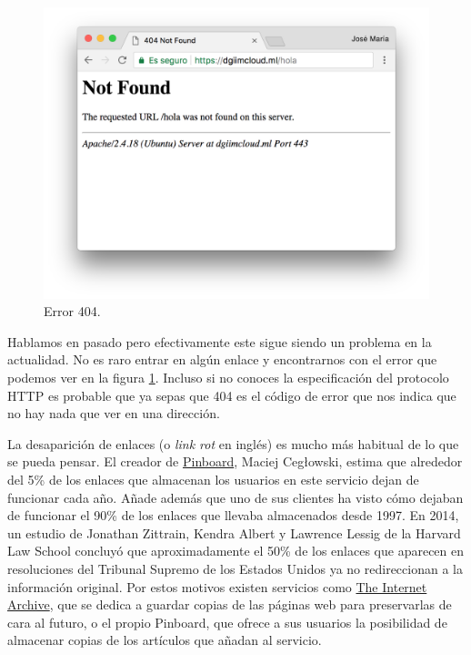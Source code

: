 \documentclass[12pt]{article} %
\begin{document}
\begin{figure}[h]
\includegraphics[width=\textwidth]{404}
\caption{Error 404.}
\label{fig:404}
\end{figure}

Hablamos en pasado pero efectivamente este sigue siendo un problema en la actualidad. No es raro entrar en algún enlace y encontrarnos con el error que podemos ver en la figura \ref{fig:404}. Incluso si no conoces la especificación del protocolo HTTP es probable que ya sepas que 404 es el código de error que nos indica que no hay nada que ver en una dirección.

La desaparición de enlaces (o \textit{link rot} en inglés) es mucho más habitual de lo que se pueda pensar. El creador de \href{pinboard.in}{Pinboard}, Maciej Cegłowski, estima que alrededor del 5\% de los enlaces que almacenan los usuarios en este servicio dejan de funcionar cada año\cite{pinboard-dead-links}. Añade además que uno de sus clientes ha visto cómo dejaban de funcionar el 90\% de los enlaces que llevaba almacenados desde 1997. En 2014, un estudio de Jonathan Zittrain, Kendra Albert y Lawrence Lessig de la Harvard Law School concluyó que aproximadamente el 50\% de los enlaces que aparecen en resoluciones del Tribunal Supremo de los Estados Unidos ya no redireccionan a la información original\cite{scotus-dead-links}. Por estos motivos existen servicios como \href{https://archive.org/}{The Internet Archive}, que se dedica a guardar copias de las páginas web para preservarlas de cara al futuro, o el propio Pinboard, que ofrece a sus usuarios la posibilidad de almacenar copias de los artículos que añadan al servicio.
\end{document}
